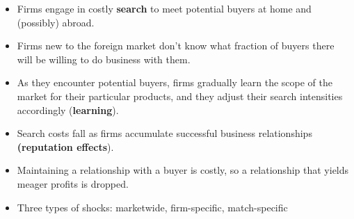 \documentclass[notes=show]{beamer}
\begin{document}
\begin{frame}%


\begin{itemize}
\item Firms engage in costly \textbf{search} to meet potential buyers at
home and (possibly) abroad.

\item Firms new to the foreign market don't know what fraction of buyers
there will be willing to do business with them.

\item As they encounter potential buyers, firms gradually learn the scope of
the market for their particular products, and they adjust their search
intensities accordingly (\textbf{learning}).

\item Search costs fall as firms accumulate successful business
relationships \textbf{(reputation effects}).

\item Maintaining a relationship with a buyer is costly, so a relationship
that yields meager profits is dropped.

\item Three types of shocks: marketwide, firm-specific, match-specific
\end{itemize}

\end{frame}%
% 
% 
% 
% 
% 
\end{document}
